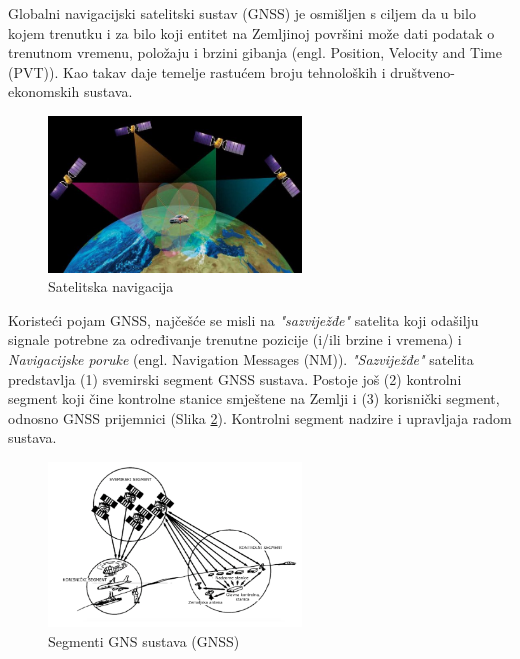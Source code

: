 \documentclass[a4paper,twoside,12pt]{memoir} %
\begin{document}
\begin{intro}
Globalni navigacijski satelitski sustav (GNSS) je osmišljen s ciljem da
u bilo kojem trenutku i za bilo koji entitet na Zemljinoj površini može dati podatak
o trenutnom vremenu, položaju i brzini gibanja (engl. Position, Velocity and Time (PVT)). 
Kao takav daje temelje rastućem broju tehnoloških i društveno-ekonomskih sustava.
	\begin{figure}[H]
		\centering
		\includegraphics[width=0.6\textwidth]{pictureNav}
		\caption{Satelitska navigacija\cite{bookProcessing} }
		\label{Fig:nn}
		
	\end{figure}
	Koristeći pojam GNSS, najčešće se misli na \textit{"sazviježđe"}
	satelita koji odašilju signale potrebne za određivanje trenutne pozicije (i/ili brzine i vremena) i \textit{Navigacijske poruke} (engl. Navigation Messages (NM)).
	\textit{"Sazviježđe"} satelita predstavlja (1) svemirski segment GNSS sustava.
	Postoje još (2) kontrolni segment koji čine kontrolne stanice smještene na Zemlji i (3) korisnički segment, odnosno GNSS prijemnici (Slika \ref{Fig:GNSSsegmenti}).
	Kontrolni segment nadzire i upravljaja radom sustava.
	
	\begin{figure}[H]
			\centering
			\includegraphics[width=0.6\textwidth]{GNSSsegmenti}
			\caption{Segmenti GNS sustava (GNSS)} %
			\label{Fig:GNSSsegmenti}
			

\end{figure}
\end{intro}
\end{document}
